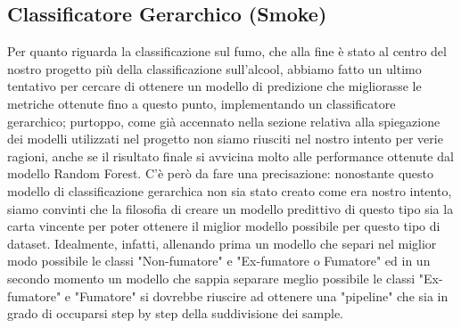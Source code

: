 \subsection{Classificatore Gerarchico (Smoke)}
Per quanto riguarda la classificazione sul fumo, che alla fine è stato al centro del nostro progetto più della classificazione sull'alcool, abbiamo fatto un ultimo tentativo per cercare di ottenere un modello di predizione che migliorasse le metriche ottenute fino a questo punto, implementando un classificatore gerarchico; purtoppo, come già accennato nella sezione relativa alla spiegazione dei modelli utilizzati nel progetto non siamo riusciti nel nostro intento per verie ragioni, anche se il risultato finale si avvicina molto alle performance ottenute dal modello Random Forest.
C'è però da fare una precisazione: nonostante questo modello di classificazione gerarchica non sia stato creato come era nostro intento, siamo convinti che la filosofia di creare un modello predittivo di questo tipo sia la carta vincente per poter ottenere il miglior modello possibile per questo tipo di dataset.
Idealmente, infatti, allenando prima un modello che separi nel miglior modo possibile le classi "Non-fumatore" e "Ex-fumatore o Fumatore" ed in un secondo momento un modello che sappia separare meglio possibile le classi "Ex-fumatore" e "Fumatore" si dovrebbe riuscire ad ottenere una "pipeline" che sia in grado di occuparsi step by step della suddivisione dei sample.



